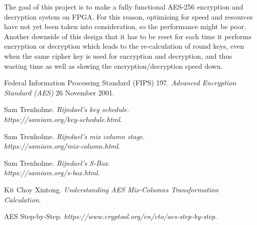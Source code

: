 \documentclass[a4paper, 10pt]{article}
\begin{document}
\begin{multicols}{2}
	The goal of this project is to make a fully functional AES-256 encryption and decryption system on FPGA. For this reason, optimising for speed and resources have not yet been taken into consideration, so the performance might be poor. Another downside of this design that it has to be reset for each time it performs encryption or decryption which leads to the re-calculation of round keys, even when the same cipher key is used for encryption and decryption, and thus wasting time as well as slowing the encryption/decryption speed down.

        \begin{thebibliography}{3}
            Federal Information Processing Standard (FIPS) 197.
            \textit{Advanced Encryption Standard (AES)}
            26 November 2001.

            Sam Trenholme.
            \textit{Rijndael's key schedule.\\https://samiam.org/key-schedule.html}.

            Sam Trenholme.
            \textit{Rijndael's mix column stage.\\https://samiam.org/mix-column.html}.

            Sam Trenholme.
            \textit{Rijndael's S-Box.\\https://samiam.org/s-box.html}.

            Kit Choy Xintong.
            \textit{Understanding AES Mix-Columns Transformation Calculation}.

            AES Step-by-Step.
            \textit{https://www.cryptool.org/en/cto/aes-step-by-step}.
        \end{thebibliography}

    \end{multicols}
\end{document}

